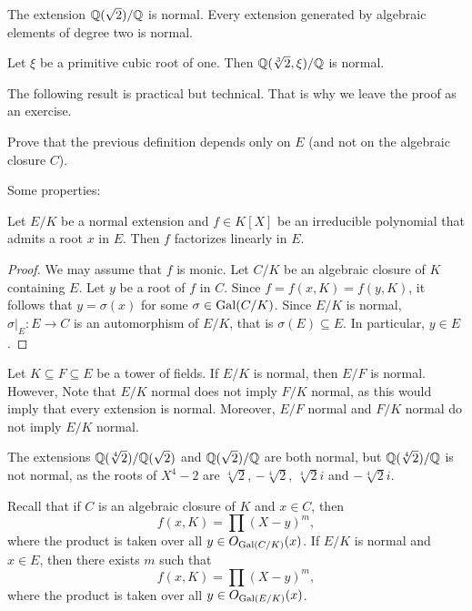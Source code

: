 \begin{example}
    The extension $\mathbb{Q}(\sqrt{2})/\mathbb{Q}$ is normal. 
    Every extension generated by algebraic elements of degree two is normal. 
\end{example}

\begin{exercise}
    Let $\xi$ be a primitive cubic root of one. Then 
    $\mathbb{Q}(\sqrt[3]{2},\xi)/\mathbb{Q}$ is normal. 
\end{exercise}

The following result is practical but technical. That is why we leave the proof
as an exercise. 

\begin{exercise}
    Prove that the previous definition depends only on $E$ (and not on the
    algebraic closure $C$). 
\end{exercise}

Some properties:

\begin{proposition}
    Let $E/K$ be a normal extension and $f\in K[X]$ be an irreducible polynomial
    that admits a root $x$ in $E$. Then $f$ factorizes
    linearly in $E$.
\end{proposition}

\begin{proof}
    We may assume that $f$ is monic. Let $C/K$ be an algebraic closure of $K$ containing $E$. 
    Let $y$ be a root of $f$ in $C$. Since $f=f(x,K)=f(y,K)$, 
    it follows that $y=\sigma(x)$ for some $\sigma\in\operatorname{Gal}(C/K)$. Since 
    $E/K$ is normal, $\sigma|_E\colon E\to C$ is an automorphism of $E/K$, that is
    $\sigma(E)\subseteq E$. In particular, $y\in E$. 
\end{proof}

Let $K\subseteq F\subseteq E$ be a tower of fields. 
If $E/K$ is normal, then $E/F$ is normal. However, 
Note that $E/K$ normal does not imply $F/K$ normal, as this would imply 
that every extension is normal. Moreover, 
$E/F$ normal and $F/K$ normal do not imply $E/K$ normal.
    
\begin{example}
The extensions $\mathbb{Q}(\sqrt[4]{2})/\mathbb{Q}(\sqrt{2})$ and $\mathbb{Q}(\sqrt{2})/\mathbb{Q}$ are both
normal, but $\mathbb{Q}(\sqrt[4]{2})/\mathbb{Q}$ is not normal, 
as the roots of $X^4-2$ are
$\sqrt[4]{2}$, $-\sqrt[4]{2}$, $\sqrt[4]{2}i$ and $-\sqrt[4]{2}i$.
\end{example}


Recall that if $C$ is an algebraic closure of $K$ and $x\in C$,
then 
\[
f(x,K)=\prod(X-y)^m,
\]
where the product is taken over all 
$y\in O_{\operatorname{Gal}(C/K)}(x)$. 
If $E/K$ is normal and $x\in E$, then there exists $m$ such that 
\[
f(x,K)=\prod(X-y)^m,
\]
where the product is taken over all 
$y\in O_{\operatorname{Gal}(E/K)}(x)$. 


